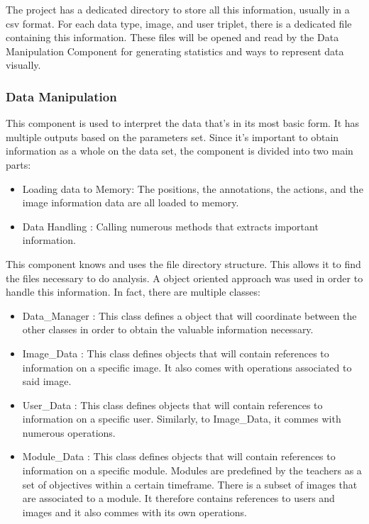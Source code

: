 \documentclass[a4paper,11pt]{report}
\numberwithin{figure}{section} %
\begin{document}
        
        The project has a dedicated directory to store all this information, usually in a csv format. For each data type, image, and user triplet, there is a dedicated file containing this information. These files will be opened and read by the Data Manipulation Component for generating statistics and ways to represent data visually.
        
        
	\subsubsection{Data Manipulation}
    
    This component is used to interpret the data that's in its most basic form. It has multiple outputs based on the parameters set. Since it's important to obtain information as a whole on the data set, the component is divided into two main parts:
    \begin{itemize}
        \item[\textbullet] Loading data to Memory: The positions, the annotations, the actions, and the image information data are all loaded to memory.
        \item[\textbullet] Data Handling : Calling numerous methods that extracts important information.
    \end{itemize}

    This component knows and uses the file directory structure. This allows it to find the files necessary to do analysis.
    A object oriented approach was used in order to handle this information. In fact, there are multiple classes:

    \begin{itemize}
        \item[\textbullet] Data\_Manager : This class defines a object that will coordinate between the other classes in order to obtain the valuable information necessary.
        \item[\textbullet] Image\_Data : This class defines objects that will contain references to information on a specific image. It also comes with operations associated to said image.
        \item[\textbullet] User\_Data : This class defines objects that will contain references to information on a specific user. Similarly, to Image\_Data, it commes with numerous operations.
        \item[\textbullet] Module\_Data : This class defines objects that will contain references to information on a specific module. Modules are predefined by the teachers as a set of objectives within a certain timeframe. There is a subset of images that are associated to a module. It therefore contains references to users and images and it also commes with its own operations.
    \end{itemize}
\end{document}
